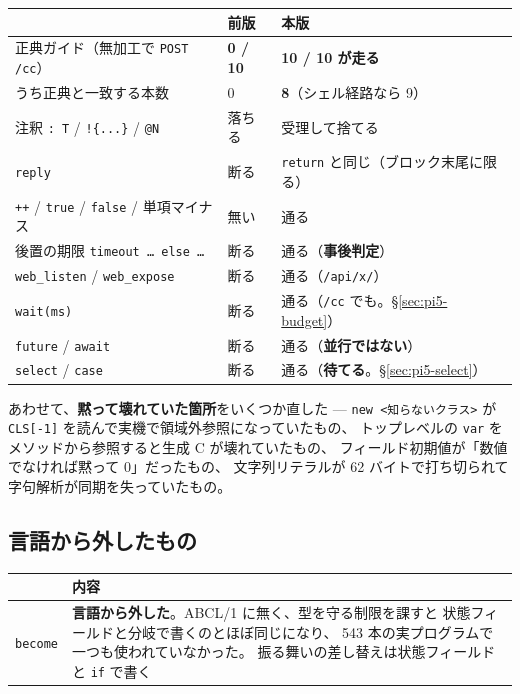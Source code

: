 \documentclass[11pt,a4paper]{ltjsarticle}
\begin{document}
\begin{center}
\small
\begin{tabular}{@{}lll@{}}
\toprule
 & 前版 & 本版 \\
\midrule
正典ガイド（無加工で \texttt{POST /cc}） & \textbf{0 / 10} & \textbf{10 / 10 が走る}\\
\quad うち正典と一致する本数 & 0 & \textbf{8}（シェル経路なら 9） \\
注釈 \texttt{: T} / \texttt{!\{...\}} / \texttt{@N} & 落ちる & 受理して捨てる \\
\texttt{reply} & 断る & \texttt{return} と同じ（ブロック末尾に限る） \\
\texttt{++} / \texttt{true} / \texttt{false} / 単項マイナス & 無い & 通る \\
後置の期限 \texttt{timeout … else …} & 断る & 通る（\textbf{事後判定}） \\
\texttt{web\_listen} / \texttt{web\_expose} & 断る & 通る（\texttt{/api/x/}） \\
\texttt{wait(ms)} & 断る & 通る（\texttt{/cc} でも。\S\ref{sec:pi5-budget}） \\
\texttt{future} / \texttt{await} & 断る & 通る（\textbf{並行ではない}） \\
\texttt{select} / \texttt{case} & 断る & 通る（\textbf{待てる}。\S\ref{sec:pi5-select}） \\
\bottomrule
\end{tabular}
\end{center}

あわせて、\textbf{黙って壊れていた箇所}をいくつか直した ---
\texttt{new <知らないクラス>} が \texttt{CLS[-1]} を読んで実機で領域外参照になっていたもの、
トップレベルの \texttt{var} をメソッドから参照すると生成 C が壊れていたもの、
フィールド初期値が「数値でなければ黙って 0」だったもの、
文字列リテラルが 62 バイトで打ち切られて字句解析が同期を失っていたもの。

\subsection{言語から外したもの}

\begin{center}
\small
\begin{tabular}{@{}lp{8.6cm}@{}}
\toprule
 & 内容 \\
\midrule
\texttt{become} & \textbf{言語から外した}。ABCL/1 に無く、型を守る制限を課すと
  状態フィールドと分岐で書くのとほぼ同じになり、
  543 本の実プログラムで一つも使われていなかった。
  振る舞いの差し替えは状態フィールドと \texttt{if} で書く \\
\bottomrule
\end{tabular}
\end{center}
\end{document}
